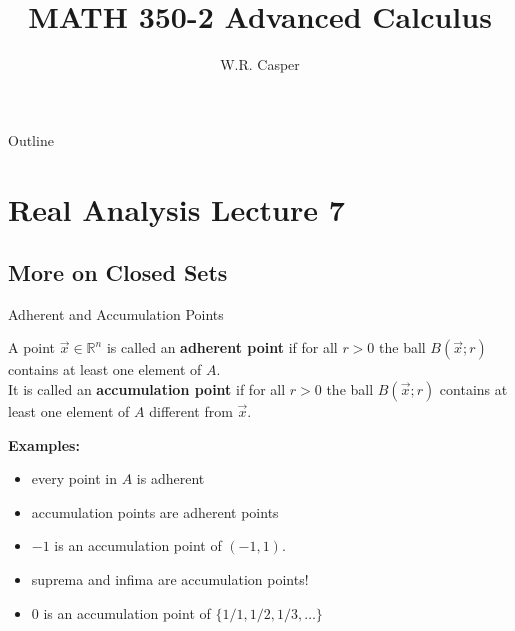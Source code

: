 \documentclass{beamer}
\title{MATH 350-2 Advanced Calculus}
\subtitle
{} %
\author[W.R. Casper] %
{W.R. Casper}
\institute[California State University Fullerton] %
{
  Department of Mathematics\\
  California State University Fullerton}
\begin{document}
\begin{frame}
  \titlepage
\end{frame}

\begin{frame}{Outline}
  \tableofcontents
\end{frame}



\section{Real Analysis Lecture 7}
\subsection{More on Closed Sets}

\begin{frame}{Adherent and Accumulation Points}
\begin{defn}
A point $\vec x\in \mathbb{R}^n$ is called an \textbf{adherent point} if for all $r > 0$ the ball $B(\vec x; r)$ contains at least one element of $A$.\\
\pause
It is called an \textbf{accumulation point} if for all $r > 0$ the ball $B(\vec x; r)$ contains at least one element of $A$ {\color{red} different from $\vec x$}.
\end{defn}
\pause
\textbf{Examples:}
\begin{itemize}
\pause
\item every point in $A$ is adherent
\pause
\item accumulation points are adherent points
\pause
\item $-1$ is an accumulation point of $(-1,1)$.
\pause
\item suprema and infima are accumulation points!
\pause
\item $0$ is an accumulation point of $\{1/1,1/2,1/3,\dots\}$
\end{itemize}
\end{frame}
\end{document}
